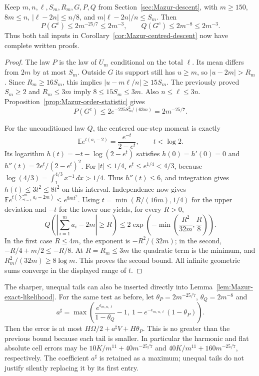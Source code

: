 \begin{corollary}
\label{cor:Mazur-two-tails}
Keep $m,n,\ell,S_m,R_m,G,P,Q$ from
Section~\ref{sec:Mazur-descent}, with
$m\ge150$, $8m\le n$, $|\ell-2n|\le n/8$, and
$m|\ell-2n|/n\le S_m$. Then
\begin{equation}
 P(G^c)\le2m^{-25/7}\le2m^{-3},\qquad
 Q(G^c)\le2m^{-8}\le2m^{-3}.
 \label{eq:Mazur-two-tails}
\end{equation}
Thus both tail inputs in Corollary~\ref{cor:Mazur-centred-descent}
now have complete written proofs.
\end{corollary}
\begin{proof}
The law $P$ is the law of $U_m$ conditional on the total $\ell$.
Its mean differs from $2m$ by at most $S_m$.
Outside $G$ its support still has $u\ge m$, so $|u-2m|>R_m$.
Since $R_m\ge16S_m$, this implies
$|u-m\ell/n|\ge15S_m$.
The previously proved $S_m\ge2$ and $R_m\le3m$ imply
$8\le15S_m\le3m$. Also $n\le\ell\le3n$.
Proposition~\ref{prop:Mazur-order-statistic} gives
\[
 P(G^c)\le2e^{-225S_m^2/(63m)}=2m^{-25/7}.
\]

For the unconditioned law $Q$, the centered one-step moment is exactly
\[
 \mathbb E e^{t(a_i-2)}
       =\frac{e^{-t}}{2-e^t},\qquad t<\log2.
\]
Its logarithm $h(t)=-t-\log(2-e^t)$ satisfies
$h(0)=h'(0)=0$ and $h''(t)=2e^t/(2-e^t)^2$.
For $|t|\le1/4$, $e^t\le e^{1/4}<4/3$, because
$\log(4/3)=\int_1^{4/3}x^{-1}\,dx>1/4$.
Thus $h''(t)\le6$, and integration gives
$h(t)\le3t^2\le8t^2$ on this interval.
Independence now gives
$\mathbb E e^{t(\sum_{i=1}^m a_i-2m)}\le e^{8mt^2}$.
Using $t=\min(R/(16m),1/4)$ for the upper deviation and $-t$
for the lower one yields, for every $R>0$,
\[
 Q\left(\left|\sum_{i=1}^m a_i-2m\right|\ge R\right)
 \le2\exp\left(-\min\left(\frac{R^2}{32m},\frac R8\right)\right).
\]
In the first case $R\le4m$, the exponent is $-R^2/(32m)$;
in the second, $-R/4+m/2\le-R/8$.
At $R=R_m\le3m$ the quadratic term is the minimum, and
$R_m^2/(32m)\ge8\log m$. This proves the second bound.
All infinite geometric sums converge in the displayed range of $t$.
\end{proof}

The sharper, unequal tails can also be inserted directly into
Lemma~\ref{lem:Mazur-exact-likelihood}. For the same test as before, let
$\theta_P=2m^{-25/7}$, $\theta_Q=2m^{-8}$ and
\[
 a^\sharp=\max\left(
       \frac{e^{\epsilon_{m,n,\ell}}}{1-\theta_Q}-1,\
       1-e^{-\epsilon_{m,n,\ell}}(1-\theta_P)\right).
\]
Then the error is at most $H\Omega/2+a^\sharp V+H\theta_P$.
This is no greater than the previous bound because each tail is smaller.
In particular the harmonic and flat absolute cell errors may be
$10K/m^{11}+40m^{-25/7}$ and
$40K/m^{11}+160m^{-25/7}$, respectively.
The coefficient $a^\sharp$ is retained as a maximum; unequal tails
do not justify silently replacing it by its first entry.

